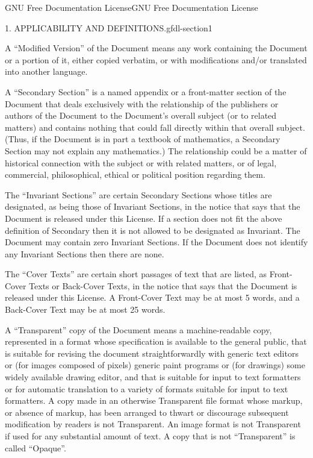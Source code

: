 \documentclass[10pt,]{book}
\numberwithin{equation}{section}
\begin{document}
\begin{appendixptx}{GNU Free Documentation License}{}{GNU Free Documentation License}{}{}
\begin{paragraphs}{1. APPLICABILITY AND DEFINITIONS.}{gfdl-section1}
\par
\hypertarget{p-1313}{}%
A ``Modified Version'' of the Document means any work containing the Document or a portion of it, either copied verbatim, or with modifications and/or translated into another language.%
\par
\hypertarget{p-1314}{}%
A ``Secondary Section'' is a named appendix or a front-matter section of the Document that deals exclusively with the relationship of the publishers or authors of the Document to the Document's overall subject (or to related matters) and contains nothing that could fall directly within that overall subject. (Thus, if the Document is in part a textbook of mathematics, a Secondary Section may not explain any mathematics.) The relationship could be a matter of historical connection with the subject or with related matters, or of legal, commercial, philosophical, ethical or political position regarding them.%
\par
\hypertarget{p-1315}{}%
The ``Invariant Sections'' are certain Secondary Sections whose titles are designated, as being those of Invariant Sections, in the notice that says that the Document is released under this License. If a section does not fit the above definition of Secondary then it is not allowed to be designated as Invariant. The Document may contain zero Invariant Sections. If the Document does not identify any Invariant Sections then there are none.%
\par
\hypertarget{p-1316}{}%
The ``Cover Texts'' are certain short passages of text that are listed, as Front-Cover Texts or Back-Cover Texts, in the notice that says that the Document is released under this License. A Front-Cover Text may be at most 5 words, and a Back-Cover Text may be at most 25 words.%
\par
\hypertarget{p-1317}{}%
A ``Transparent'' copy of the Document means a machine-readable copy, represented in a format whose specification is available to the general public, that is suitable for revising the document straightforwardly with generic text editors or (for images composed of pixels) generic paint programs or (for drawings) some widely available drawing editor, and that is suitable for input to text formatters or for automatic translation to a variety of formats suitable for input to text formatters. A copy made in an otherwise Transparent file format whose markup, or absence of markup, has been arranged to thwart or discourage subsequent modification by readers is not Transparent. An image format is not Transparent if used for any substantial amount of text. A copy that is not ``Transparent'' is called ``Opaque''.%

\end{paragraphs}
\end{appendixptx}
\end{document}
